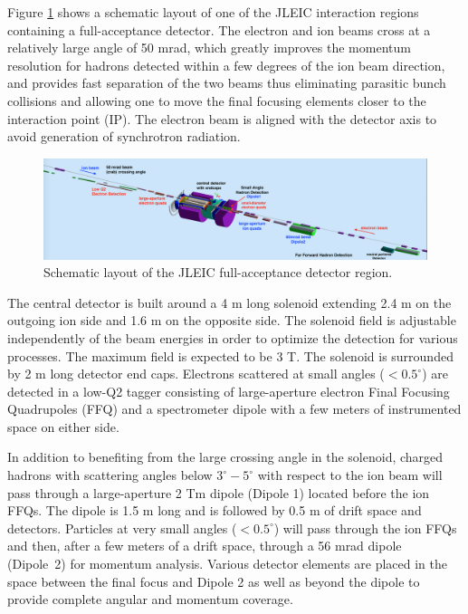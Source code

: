 Figure \ref{fig:detector_schematic} shows a schematic layout of one of the JLEIC interaction regions containing a full-acceptance detector\cite{Abeyratne:2012ah}\cite{Abeyratne:2015pma}\cite{Lin:2013}\cite{Morozov:2012}\cite{Morozov:2014}.  The electron and ion beams cross at a relatively large angle of 50 mrad, which greatly improves the momentum resolution for hadrons detected within a few degrees of the ion beam direction, and provides fast separation of the two beams thus eliminating parasitic bunch collisions and allowing one to move the final focusing elements closer to the interaction point (IP). The electron beam is aligned with the detector axis to avoid generation of synchrotron radiation.


\begin{figure}[!htb]
\centering
\includegraphics[width=.75\textwidth]{../../img/detector_schematic2.png}
\caption{Schematic layout of the JLEIC full-acceptance detector region.}
\label{fig:detector_schematic}
\end{figure}

The central detector is built around a 4 m long solenoid extending 2.4 m on the outgoing ion side and 1.6 m on the opposite side. The solenoid field is adjustable independently of the beam energies in order to optimize the detection for various processes. The maximum field is expected to be 3 T. The solenoid is surrounded by 2 m long detector end caps. Electrons scattered at small angles ($<0.5^{\circ}$) are detected in a low-Q2 tagger consisting of large-aperture electron Final Focusing Quadrupoles (FFQ) and a spectrometer dipole with a few meters of instrumented space on either side.

In addition to benefiting from the large crossing angle in the solenoid, charged hadrons with scattering angles below $3^{\circ}-5^{\circ}$ with respect to the ion beam will pass through a large-aperture 2 Tm dipole (Dipole 1) located before the ion FFQs. The dipole is 1.5 m long and is followed by 0.5 m of drift space and detectors. Particles at very small angles ($<0.5^{\circ}$)  will pass through the ion FFQs and then, after a few meters of a drift space, through a 56 mrad dipole (Dipole 2) for momentum analysis. Various detector elements are placed in the space between the final focus and Dipole 2 as well as beyond the dipole to provide complete angular and momentum coverage.

